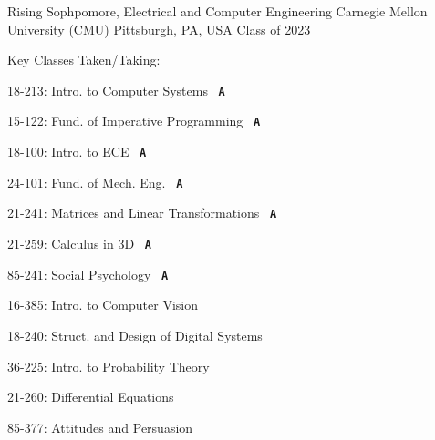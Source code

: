 
\newcommand{\grade}[1]{\ \textcolor{awesome-orange}{\textbf{\large\texttt{{#1}}}}}



\begin{cventries}


\cventry
{Rising Sophpomore, Electrical and Computer Engineering} %
{Carnegie Mellon University (CMU)} %
{Pittsburgh, PA, USA} %
{Class of 2023} %
{ %
	Key Classes Taken/Taking:\smallskip
	\begin{cvitems}
	\begin{multicols}{2}[]
		\item 18-213: Intro. to Computer Systems \grade{A}
		\item 15-122: Fund. of Imperative Programming \grade{A}
		\item 18-100: Intro. to ECE \grade{A}
		\item 24-101: Fund. of Mech. Eng. \grade{A}
		\item 21-241: Matrices and Linear Transformations \grade{A}
		\item 21-259: Calculus in 3D \grade{A}
		\item 85-241: Social Psychology \grade{A}
		\item 16-385: Intro. to Computer Vision \grade{}
		\item 18-240: Struct. and Design of Digital Systems \grade{}
		\item 36-225: Intro. to Probability Theory \grade{}
		\item 21-260: Differential Equations \grade{}
		\item 85-377: Attitudes and Persuasion \grade{} 
	\end{multicols}
	\end{cvitems}
}


\end{cventries}